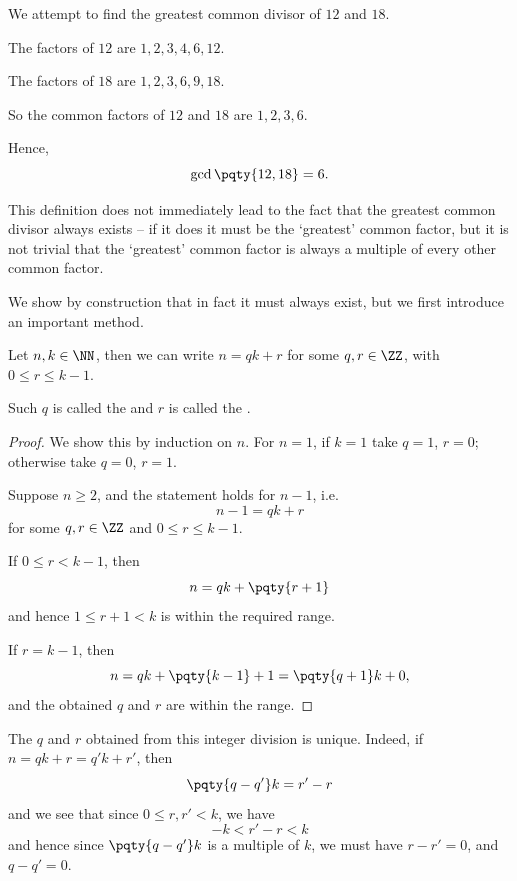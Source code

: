 \begin{example}
    We attempt to find the greatest common divisor of \(12\) and \(18\).

    The factors of \(12\) are \(1, 2, 3, 4, 6, 12\).

    The factors of \(18\) are \(1, 2, 3, 6, 9, 18\).

    So the common factors of \(12\) and \(18\) are \(1, 2, 3, 6\).

    Hence,
    \[
        \gcd\pqty{12, 18} = 6.
    \]
\end{example}

This definition does not immediately lead to the fact that the greatest common divisor always exists -- if it does it must be the `greatest' common factor, but it is not trivial that the `greatest' common factor is always a multiple of every other common factor.

We show by construction that in fact it must always exist, but we first introduce an important method.

\begin{proposition}
    Let \(n, k \in \NN\), then we can write \(n = qk + r\) for some \(q, r \in \ZZ\), with \(0 \leq r \leq k - 1\).
    
    Such \(q\) is called the  and \(r\) is called the .
\end{proposition}

\begin{proof}
    We show this by induction on \(n\). For \(n = 1\), if \(k = 1\) take \(q = 1\), \(r = 0\); otherwise take \(q = 0\), \(r = 1\).

    Suppose \(n \geq 2\), and the statement holds for \(n - 1\), i.e.
    \[
        n - 1 = qk + r
    \]
    for some \(q, r \in \ZZ\) and \(0 \leq r \leq k - 1\).

    If \(0 \leq r < k - 1\), then
    \[
        n = qk + \pqty{r + 1}
    \]
    and hence \(1 \leq r + 1 < k\) is within the required range.

    If \(r = k - 1\), then
    \[
        n = qk + \pqty{k - 1} + 1 = \pqty{q + 1}k + 0,
    \]
    and the obtained \(q\) and \(r\) are within the range.
\end{proof}

\begin{remark}
    The \(q\) and \(r\) obtained from this integer division is unique. Indeed, if \(n = qk + r = q'k + r'\), then
    \[
        \pqty{q - q'}k = r' - r
    \]
    and we see that since \(0 \leq r, r' < k\), we have
    \[
        -k < r' - r < k
    \]
    and hence since \(\pqty{q - q'}k\) is a multiple of \(k\), we must have \(r - r' = 0\), and \(q - q' = 0\).
\end{remark}

